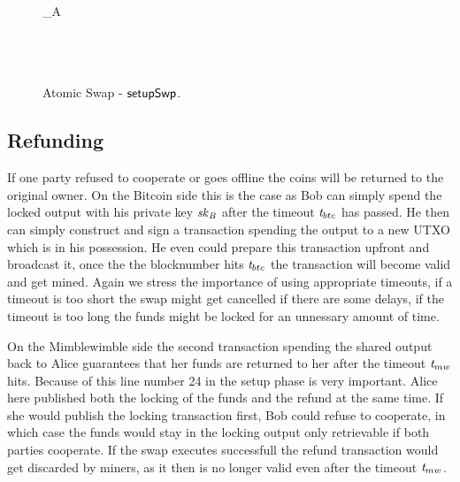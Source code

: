 \begin{landscape}
\begin{figure}
{{        \varUTXO_{A} \opFunResult \procCreateUTXO{\varAmountBtc}{\funStarAlt{\varPubKeyAlice}} \< \< \< \< \\
        \varBtcTx \opFunResult {} \< \< \< \< \\
        \funStar{\varBtcTx} \opFunResult {} \< \< \< \< \\
        \procPublishBtc{\funStar{\varBtcTx}} \< \< \< \< \\
         \< \< \< \< 
        }
        }
        \caption{Atomic Swap - $\mathsf{setupSwp}$. \label{fig:exec-swap}}
    \end{figure}
\end{landscape}

\subsection{Refunding}

If one party refused to cooperate or goes offline the coins will be returned to the original owner.
On the Bitcoin side this is the case as Bob can simply spend the locked output with his private key $\mathit{sk}_{\mathit{B}}$ after the timeout $\mathit{t}_{btc}$ has passed.
He then can simply construct and sign a transaction spending the output to a new UTXO which is in his possession.
He even could prepare this transaction upfront and broadcast it, once the the blocknumber hits $\mathit{t}_{btc}$ the transaction will become valid and get mined.
Again we stress the importance of using appropriate timeouts, if a timeout is too short the swap might get cancelled if there are some delays, if the timeout is too long the funds might be locked for an unnessary amount of time.

On the Mimblewimble side the second transaction spending the shared output back to Alice guarantees that her funds are returned to her after the timeout $\mathit{t}_{mw}$ hits.
Because of this line number 24 in the setup phase is very important.
Alice here published both the locking of the funds and the refund at the same time.
If she would publish the locking transaction first, Bob could refuse to cooperate, in which case the funds would stay in the locking output only retrievable if both parties cooperate.
If the swap executes successfull the refund transaction would get discarded by miners, as it then is no longer valid even after the timeout $\mathit{t}_{mw}$.

\restoregeometry

